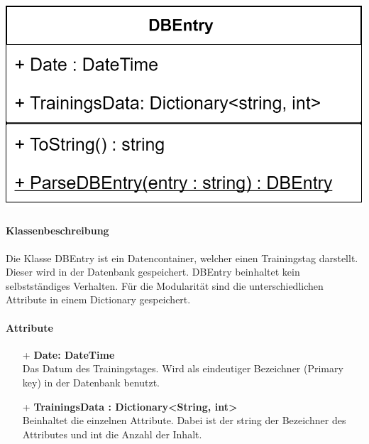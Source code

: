 \documentclass[a4paper,12pt]{article}
\begin{document}
\begin{minipage}[c]{0.5\textwidth}
	\includegraphics{bilder/EMKlassen/DBEntryClass.png}
\end{minipage}
	\paragraph{Klassenbeschreibung}
	Die Klasse DBEntry ist ein Datencontainer, welcher einen Trainingstag darstellt. Dieser wird in der Datenbank gespeichert. DBEntry beinhaltet kein selbstständiges Verhalten. Für die Modularität sind die unterschiedlichen Attribute in einem Dictionary gespeichert.
	
	\paragraph{Attribute}
	\begin{itemize}
		\item[+] \textbf{Date: DateTime}\\Das Datum des Trainingstages. Wird als eindeutiger Bezeichner (Primary key) in der \Gls{Datenbank} benutzt.\\
			\item[+] \textbf{TrainingsData : Dictionary<String, int>}\\ Beinhaltet die einzelnen Attribute. Dabei ist der string der Bezeichner des Attributes und int die Anzahl der Inhalt. 
	\end{itemize}
	 
\end{document}
